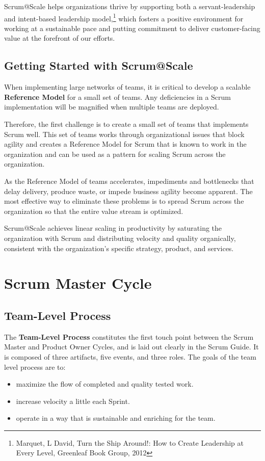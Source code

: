 \documentclass[12pt,a4paper,parskip=full]{scrartcl}
\begin{document}
Scrum@Scale helps organizations thrive by supporting both a
servant-leadership and intent-based leadership model,\footnote{Marquet, L
David, Turn the Ship Around!: How to Create Leadership at Every Level,
Greenleaf Book Group, 2012} which fosters a positive environment for
working at a sustainable pace and putting commitment to deliver
customer-facing value at the forefront of our efforts.

\subsection{Getting Started with Scrum@Scale}
When implementing large networks of teams, it is critical to develop a
scalable \textbf{Reference Model} for a small set of teams. Any
deficiencies in a Scrum implementation will be magnified when multiple
teams are deployed.

Therefore, the first challenge is to create a small set of teams that
implements Scrum well. This set of teams works through organizational
issues that block agility and creates a Reference Model for Scrum that is
known to work in the organization and can be used as a pattern for scaling
Scrum across the organization.

As the Reference Model of teams accelerates, impediments and bottlenecks
that delay delivery, produce waste, or impede business agility become
apparent. The most effective way to eliminate these problems is to spread
Scrum across the organization so that the entire value stream is optimized.

Scrum@Scale achieves linear scaling in productivity by saturating the
organization with Scrum and distributing velocity and quality organically,
consistent with the organization's specific strategy, product, and services.

\section{Scrum Master Cycle}
\subsection{Team-Level Process}
The \textbf{Team-Level Process} constitutes the first touch point between the Scrum Master and Product Owner Cycles, and is laid out clearly in the Scrum Guide. It
is composed of three artifacts, five events, and three roles. The goals of
the team level process are to:
\begin{itemize}
\item maximize the flow of completed and quality tested work.
\item increase velocity a little each Sprint.
\item operate in a way that is sustainable and enriching for the team.
\end{itemize}
\end{document}
